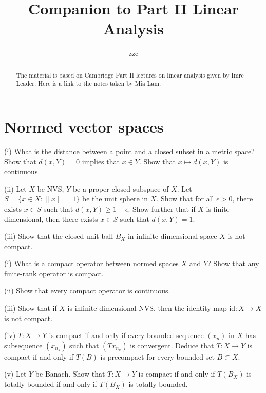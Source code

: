 \documentclass[12pt]{article}
\newcommand{\id}{\text{id}}
\newenvironment{question}[2][Question]{\begin{trivlist}
\item[\hskip \labelsep {\bfseries #1}\hskip \labelsep {\bfseries #2.}]}{\end{trivlist}}
\begin{document}
\title{Companion to Part II Linear Analysis}
\author{zzc}
\maketitle


\rhead{\today}

\begin{abstract}
    The material is based on Cambridge Part II lectures on linear analysis given by Imre Leader. Here is a link to the notes taken by Mia Lam.
\end{abstract}

\tableofcontents


\section{Normed vector spaces}
\begin{question}{1.1(Riesz's Lemma)}
	(i) What is the distance between a point and a closed subset in a metric space? Show that $d(x,Y) = 0$ implies that $x \in Y$.  Show that $x \mapsto d(x,Y)$ is continuous.
	
	(ii) Let $X$ be NVS, $Y$ be a proper closed subspace of $X$. Let $S = \{x\in X:\|x\| = 1\}$ be the unit sphere in $X$. Show that for all $\epsilon > 0$, there exists $x \in S$ such that $d(x,Y) \geq 1-\epsilon$. Show further that if $X$ is finite-dimensional, then there exists $x \in S$ such that $d(x,Y) = 1$.
	
	(iii) Show that the closed unit ball $B_X$ in infinite dimensional space $X$ is not compact.
\end{question}


\begin{question}{1.2(Compact Operator Definition)}
	(i) What is a compact operator between normed spaces $X$ and $Y$? Show that any finite-rank operator is compact.
	
	(ii) Show that every compact operator is continuous.
	
	(iii) Show that if $X$ is infinite dimensional NVS, then the identity map $\id:X\rightarrow X$ is not compact.
	
	(iv) $T:X\rightarrow Y$ is compact if and only if every bounded sequence $(x_n)$ in $X$ has subsequence $(x_{n_k})$ such that $(Tx_{n_k})$ is convergent. Deduce that $T:X\rightarrow Y$ is compact if and only if $T(B)$ is precompact for every bounded set $B \subset X$.
	
	(v) Let $Y$ be Banach. Show that $T:X\rightarrow Y$ is compact if and only if $\overline{T(B_X)}$ is totally bounded if and only if $T(B_X)$ is totally bounded.
\end{question}
\end{document}
